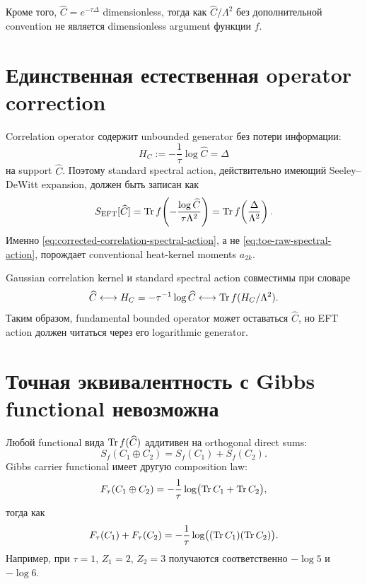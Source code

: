 Кроме того, \(\widehat C=e^{-\tau\Delta}\) dimensionless, тогда как
\(\widehat C/\Lambda^2\) без дополнительной convention не является
dimensionless argument функции \(f\).

\section{Единственная естественная operator correction}

Correlation operator содержит unbounded generator без потери информации:
\begin{equation}
 H_C:=-\frac1\tau\log\widehat C=\Delta
 \label{eq:correlation-log-generator}
\end{equation}
на support \(\widehat C\). Поэтому standard spectral action, действительно
имеющий Seeley--DeWitt expansion, должен быть записан как
\begin{equation}
 S_{\rm EFT}[\widehat C]
 =\operatorname{Tr} f\!\left(
 -\frac{\log\widehat C}{\tau\Lambda^2}
 \right)
 =\operatorname{Tr} f\!\left(\frac{\Delta}{\Lambda^2}\right).
 \label{eq:corrected-correlation-spectral-action}
\end{equation}
Именно \eqref{eq:corrected-correlation-spectral-action}, а не
\eqref{eq:toe-raw-spectral-action}, порождает conventional heat-kernel
moments \(a_{2k}\).

\begin{proposition}
Gaussian correlation kernel и standard spectral action совместимы при
словаре
\begin{equation}
 \widehat C
 \longleftrightarrow
 H_C=-\tau^{-1}\log\widehat C
 \longleftrightarrow
 \operatorname{Tr} f(H_C/\Lambda^2).
\end{equation}
Таким образом, fundamental bounded operator может оставаться \(\widehat C\),
но EFT action должен читаться через его logarithmic generator.
\end{proposition}

\section{Точная эквивалентность с Gibbs functional невозможна}

Любой functional вида \(\operatorname{Tr} f(\widehat C)\) аддитивен на orthogonal direct
sums:
\begin{equation}
 S_f(C_1\oplus C_2)=S_f(C_1)+S_f(C_2).
\end{equation}
Gibbs carrier functional имеет другую composition law:
\begin{equation}
 F_\tau(C_1\oplus C_2)
 =-\frac1\tau\log\bigl(\operatorname{Tr} C_1+\operatorname{Tr} C_2\bigr),
\end{equation}
тогда как
\begin{equation}
 F_\tau(C_1)+F_\tau(C_2)
 =-\frac1\tau\log\bigl((\operatorname{Tr} C_1)(\operatorname{Tr} C_2)\bigr).
\end{equation}
Например, при \(\tau=1\), \(Z_1=2\), \(Z_2=3\) получаются соответственно
\(-\log5\) и \(-\log6\).

